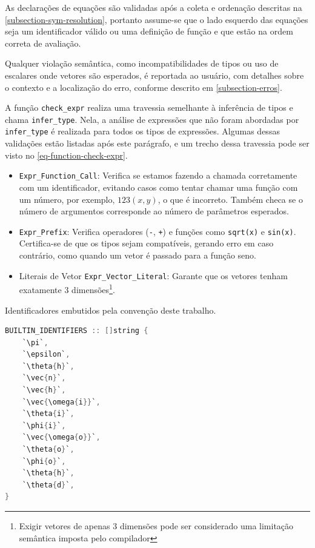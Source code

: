 As declarações de equações são validadas após a coleta e ordenação descritas na \autoref{subsection-sym-resolution}, portanto assume-se que o lado esquerdo das equações seja um identificador válido ou uma definição de função e que estão na ordem correta de avaliação.

Qualquer violação semântica, como incompatibilidades de tipos ou uso de escalares onde vetores são esperados, é reportada ao usuário, com detalhes sobre o contexto e a localização do erro, conforme descrito em \autoref{subsection-erros}.

A função \verb"check_expr" realiza uma travessia semelhante à inferência de tipos e chama \texttt{infer\_type}. Nela, a análise de expressões que não foram abordadas por \texttt{infer\_type} é realizada para todos os tipos de expressões. Algumas dessas validações estão listadas após este parágrafo, e um trecho dessa travessia pode ser visto no \autoref{eq-function-check-expr}.

\begin{itemize}
    \item \verb`Expr_Function_Call`: Verifica se estamos fazendo a chamada corretamente com um identificador, evitando casos como tentar chamar uma função com um número, por exemplo, $123(x,y)$, o que é incorreto. Também checa se o número de argumentos corresponde ao número de parâmetros esperados.
    \item \verb`Expr_Prefix`: Verifica operadores (\verb`-`, \verb`+`) e funções como \verb`sqrt(x)` e \verb`sin(x)`. Certifica-se de que os tipos sejam compatíveis, gerando erro em caso contrário, como quando um vetor é passado para a função seno.
    \item Literais de Vetor \verb`Expr_Vector_Literal`: Garante que os vetores tenham exatamente 3 dimensões\footnote{Exigir vetores de apenas 3 dimensões pode ser considerado uma limitação semântica imposta pelo compilador}.
\end{itemize}




\begin{codigo}[H]
    \caption{\small Identificadores embutidos pela convenção deste trabalho.}
    \label{cod-builtins}
\begin{lstlisting}[language=C, numbers=none, frame=none, inputencoding=latin1]
BUILTIN_IDENTIFIERS :: []string {
    `\pi`,
    `\epsilon`,
    `\theta{h}`,
    `\vec{n}`,
    `\vec{h}`,
    `\vec{\omega{i}}`,
    `\theta{i}`,
    `\phi{i}`,
    `\vec{\omega{o}}`,
    `\theta{o}`,
    `\phi{o}`,
    `\theta{h}`,
    `\theta{d}`,
}
\end{lstlisting}
\end{codigo}



